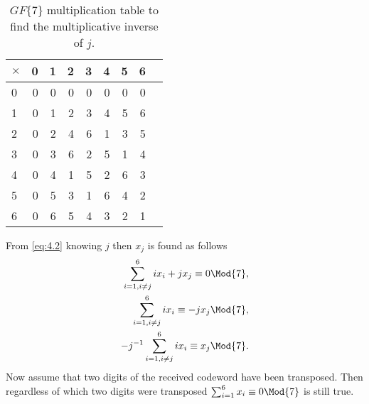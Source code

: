 \begin{table}[!htp]\centering
\begin{tabular}{l|rrrrrrrr}
$\times$ &0 &1 &2 &3 &4 &5 &6 \\\midrule
0 &0 &0 &0 &0 &0 &0 &0 \\
1 &0 &1 &2 &3 &4 &5 &6 \\
2 &0 &2 &4 &6 &1 &3 &5 \\
3 &0 &3 &6 &2 &5 &1 &4 \\
4 &0 &4 &1 &5 &2 &6 &3 \\
5 &0 &5 &3 &1 &6 &4 &2 \\
6 &0 &6 &5 &4 &3 &2 &1 \\
\end{tabular}
\caption{$GF\{7\}$ multiplication table to find the multiplicative inverse of $j$.}\label{tab:16}
\end{table}
From \eqref{eq:4.2} knowing $j$ then $x_j$ is found as follows
\begin{align}
\label{eq:4.9}
	\sum_{i=1,i\neq j}^{6} ix_i + jx_j \equiv 0 \Mod{7},\nonumber\\
	\sum_{i=1,i\neq j}^{6} ix_i \equiv -jx_j \Mod{7}, \nonumber\\
	-j^{-1}\sum_{i=1,i\neq j}^{6} ix_i \equiv x_j \Mod{7}.
\end{align}
Now assume that two digits of the received codeword have been transposed. Then regardless of which two digits were transposed $\sum_{i=1}^6 x_i\equiv 0 \Mod{7}$ is still true. 


